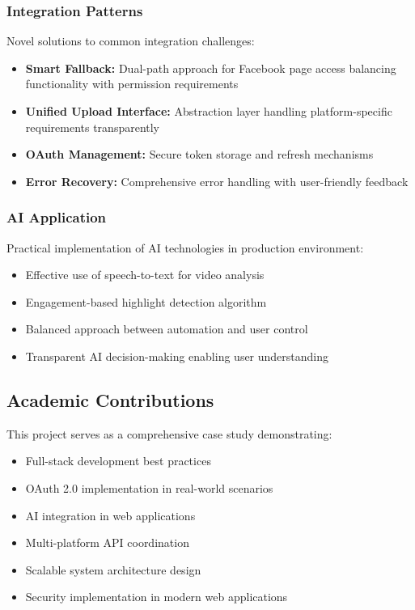 \subsubsection{Integration Patterns}

Novel solutions to common integration challenges:

\begin{itemize}
    \item \textbf{Smart Fallback:} Dual-path approach for Facebook page access balancing functionality with permission requirements
    \item \textbf{Unified Upload Interface:} Abstraction layer handling platform-specific requirements transparently
    \item \textbf{OAuth Management:} Secure token storage and refresh mechanisms
    \item \textbf{Error Recovery:} Comprehensive error handling with user-friendly feedback
\end{itemize}

\subsubsection{AI Application}

Practical implementation of AI technologies in production environment:

\begin{itemize}
    \item Effective use of speech-to-text for video analysis
    \item Engagement-based highlight detection algorithm
    \item Balanced approach between automation and user control
    \item Transparent AI decision-making enabling user understanding
\end{itemize}

\subsection{Academic Contributions}

This project serves as a comprehensive case study demonstrating:

\begin{itemize}
    \item Full-stack development best practices
    \item OAuth 2.0 implementation in real-world scenarios
    \item AI integration in web applications
    \item Multi-platform API coordination
    \item Scalable system architecture design
    \item Security implementation in modern web applications
\end{itemize}

